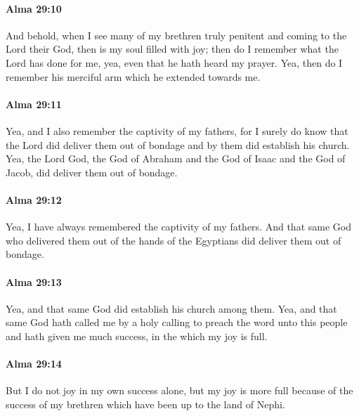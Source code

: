 		\paragraph{Alma 29:10} %
			\label{ALMA-29-10}

			And behold, when I see many of my brethren truly penitent
			and coming to the Lord their God,
			then is my soul filled with joy;
			then do I remember what the Lord has done for me,
			yea, even that he hath heard my prayer.
			Yea, then do I remember his merciful arm which he extended towards me.

		\paragraph{Alma 29:11} %
			\label{ALMA-29-11}

			Yea, and I also remember the captivity of my fathers,
			for I surely do know that the Lord did deliver them out of bondage
			and by them did establish his church.
			Yea, the Lord God, the God of Abraham and the God of Isaac and the God of Jacob,
			did deliver them out of bondage.

		\paragraph{Alma 29:12} %
			\label{ALMA-29-12}

			Yea, I have always remembered the captivity of my fathers.
			And that same God who delivered them out of the hands of the Egyptians
			did deliver them out of bondage.

		\paragraph{Alma 29:13} %
			\label{ALMA-29-13}

			Yea, and that same God did establish his church among them.
			Yea, and that same God hath called me by a holy calling
			to preach the word unto this people
			and hath given me much success, in the which my joy is full.

		\paragraph{Alma 29:14} %
			\label{ALMA-29-14}

			But I do not joy in my own success alone,
			but my joy is more full because of the success of my brethren
			which have been up to the land of Nephi.

